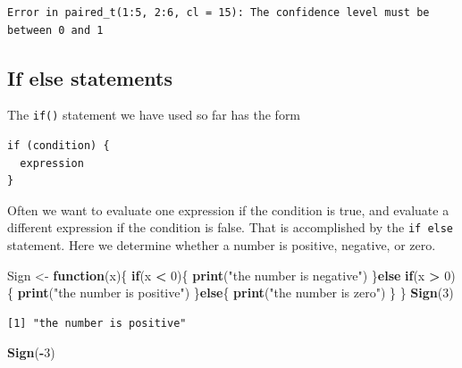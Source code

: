 \documentclass[
]{krantz}
\makeatletter
\newenvironment{Shaded}{\begin{snugshade}}{\end{snugshade}}
\newcommand{\ControlFlowTok}[1]{\textcolor[rgb]{0.27,0.27,0.27}{\textbf{#1}}}
\newcommand{\DecValTok}[1]{\textcolor[rgb]{0.06,0.06,0.06}{#1}}
\newcommand{\KeywordTok}[1]{\textcolor[rgb]{0.27,0.27,0.27}{\textbf{#1}}}
\newcommand{\NormalTok}[1]{#1}
\newcommand{\OperatorTok}[1]{\textcolor[rgb]{0.43,0.43,0.43}{\textbf{#1}}}
\newcommand{\StringTok}[1]{\textcolor[rgb]{0.5,0.5,0.5}{#1}}
\newenvironment{kframe}{%
\medskip{}
\setlength{\fboxsep}{.8em}
 \def\at@end@of@kframe{}%
 \ifinner\ifhmode%
  \def\at@end@of@kframe{\end{minipage}}%
  \begin{minipage}{\columnwidth}%
 \fi\fi%
 \def\FrameCommand##1{\hskip\@totalleftmargin \hskip-\fboxsep
 \colorbox{shadecolor}{##1}\hskip-\fboxsep
     \hskip-\linewidth \hskip-\@totalleftmargin \hskip\columnwidth}%
 \MakeFramed {\advance\hsize-\width
   \@totalleftmargin\z@ \linewidth\hsize
   \@setminipage}}%
 {\par\unskip\endMakeFramed%
 \at@end@of@kframe}
\renewenvironment{Shaded}{\begin{kframe}}{\end{kframe}}
\makeatother
\begin{document}
\begin{verbatim}
Error in paired_t(1:5, 2:6, cl = 15): The confidence level must be between 0 and 1
\end{verbatim}

\hypertarget{if-else-statements}{%
\subsection{If else statements}\label{if-else-statements}}

The \texttt{if()} statement we have used so far has the form

\begin{verbatim}
if (condition) {
  expression
}
\end{verbatim}

Often we want to evaluate one expression if the condition is true, and evaluate a different expression if the condition is false. That is accomplished by the \texttt{if\ else} statement. Here we determine whether a number is positive, negative, or zero.

\begin{Shaded}
\begin{Highlighting}[]
\NormalTok{Sign \textless{}{-}}\StringTok{ }\ControlFlowTok{function}\NormalTok{(x)\{}
    \ControlFlowTok{if}\NormalTok{(x }\OperatorTok{\textless{}}\StringTok{ }\DecValTok{0}\NormalTok{)\{}
        \KeywordTok{print}\NormalTok{(}\StringTok{"the number is negative"}\NormalTok{)}
\NormalTok{    \}}\ControlFlowTok{else} \ControlFlowTok{if}\NormalTok{(x }\OperatorTok{\textgreater{}}\StringTok{ }\DecValTok{0}\NormalTok{)\{}
        \KeywordTok{print}\NormalTok{(}\StringTok{"the number is positive"}\NormalTok{)}
\NormalTok{    \}}\ControlFlowTok{else}\NormalTok{\{}
        \KeywordTok{print}\NormalTok{(}\StringTok{"the number is zero"}\NormalTok{)}
\NormalTok{    \}}
\NormalTok{\}}
\KeywordTok{Sign}\NormalTok{(}\DecValTok{3}\NormalTok{)}
\end{Highlighting}
\end{Shaded}

\begin{verbatim}
[1] "the number is positive"
\end{verbatim}

\begin{Shaded}
\begin{Highlighting}[]
\KeywordTok{Sign}\NormalTok{(}\OperatorTok{{-}}\DecValTok{3}\NormalTok{)}
\end{Highlighting}
\end{Shaded}
\end{document}

